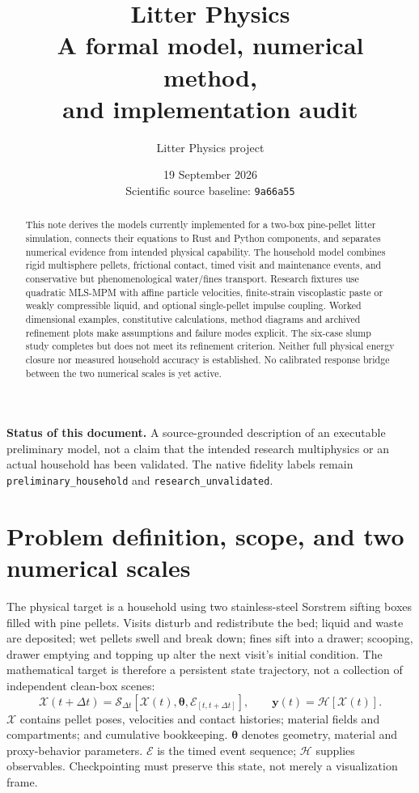 \documentclass[11pt,a4paper]{article}
\title{\textbf{Litter Physics}\\[.4em]
 A formal model, numerical method,\\and implementation audit}
\author{Litter Physics project}
\date{19 September 2026\\[.3em]\small Scientific source baseline: \nolinkurl{9a66a55}}
\numberwithin{equation}{section}
\begin{document}
\maketitle
\begin{abstract}
This note derives the models currently implemented for a two-box pine-pellet
litter simulation, connects their equations to Rust and Python components, and
separates numerical evidence from intended physical capability. The household
model combines rigid multisphere pellets, frictional contact, timed visit and
maintenance events, and conservative but phenomenological water/fines transport.
Research fixtures use quadratic MLS-MPM with affine particle velocities,
finite-strain viscoplastic paste or weakly compressible liquid, and optional
single-pellet impulse coupling. Worked dimensional examples, constitutive
calculations, method diagrams and archived refinement plots make assumptions
and failure modes explicit. The six-case slump study completes but does not
meet its refinement criterion. Neither full physical energy closure nor
measured household accuracy is established. No calibrated response bridge
between the two numerical scales is yet active.
\end{abstract}

\noindent\textbf{Status of this document.} A source-grounded description of an
executable preliminary model, not a claim that the intended research multiphysics
or an actual household has been validated. The native fidelity labels remain
\nolinkurl{preliminary_household} and \nolinkurl{research_unvalidated}.

\tableofcontents
\clearpage

\section{Problem definition, scope, and two numerical scales}
The physical target is a household using two stainless-steel Sorstrem sifting
boxes filled with pine pellets. Visits disturb and redistribute the bed; liquid
and waste are deposited; wet pellets swell and break down; fines sift into a
drawer; scooping, drawer emptying and topping up alter the next visit's initial
condition. The mathematical target is therefore a persistent state trajectory,
not a collection of independent clean-box scenes:
\begin{equation}
 \mathcal X(t+\Delta t)=\mathcal S_{\Delta t}
     [\mathcal X(t),\boldsymbol\theta,\mathcal E_{[t,t+\Delta t]}],
 \qquad \mathbf y(t)=\mathcal H[\mathcal X(t)].
 \label{eq:state-map}
\end{equation}
$\mathcal X$ contains pellet poses, velocities and contact histories; material
fields and compartments; and cumulative bookkeeping. $\boldsymbol\theta$ denotes
geometry, material and proxy-behavior parameters. $\mathcal E$ is the timed event
sequence; $\mathcal H$ supplies observables. Checkpointing must preserve this
state, not merely a visualization frame.
\end{document}
